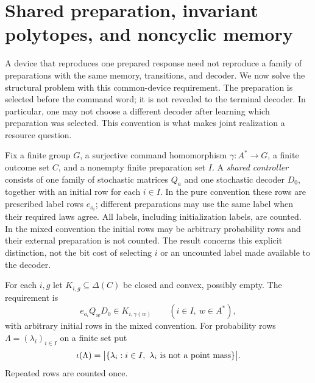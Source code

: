 \section{Shared preparation, invariant polytopes, and noncyclic memory}
\label{sec:r77-shared-preparation}

A device that reproduces one prepared response need not reproduce a family
of preparations with the same memory, transitions, and decoder.  We now
solve the structural problem with this common-device requirement.  The
preparation is selected before the command word; it is not revealed to the
terminal decoder.  In particular, one may not choose a different decoder
after learning which preparation was selected.  This convention is what
makes joint realization a resource question.

Fix a finite group $G$, a surjective command homomorphism
$\gamma:A^*\to G$, a finite outcome set $C$, and a nonempty finite
preparation set $I$.  A \emph{shared controller} consists of one family of
stochastic matrices $Q_a$ and one stochastic decoder $D_0$, together with
an initial row for each $i\in I$.  In the pure convention these rows are
prescribed label rows $e_{o_i}$; different preparations may use the same
label when their required laws agree.  All labels, including initialization
labels, are counted.  In the mixed convention the initial rows may be
arbitrary probability rows and their external preparation is not counted.
The result concerns this explicit distinction, not the bit cost of selecting
$i$ or an uncounted label made available to the decoder.

For each $i,g$ let $K_{i,g}\subseteq\Delta(C)$ be closed and convex,
possibly empty.  The requirement is
\begin{equation}\label{eq:r77-shared-specification}
 e_{o_i}Q_wD_0\in K_{i,\gamma(w)}
 \qquad(i\in I,\ w\in A^*),
\end{equation}
with arbitrary initial rows in the mixed convention.  For probability
rows $\Lambda=(\lambda_i)_{i\in I}$ on a finite set put
\[
 \iota(\Lambda)=
 \bigl|\{\lambda_i:i\in I,\ \lambda_i\hbox{ is not a point mass}\}\bigr|.
\]
Repeated rows are counted once.

